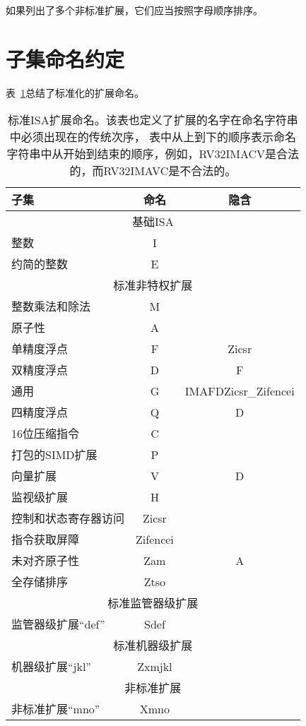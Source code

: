 如果列出了多个非标准扩展，它们应当按照字母顺序排序。

\section{子集命名约定}
表~\ref{isanametable}总结了标准化的扩展命名。
~\\
\begin{table}[h]
\center
\begin{tabular}{|l|c|c|}
\hline
子集 & 命名 & 隐含 \\
\hline
\hline
\multicolumn{3}{|c|}{基础ISA}\\
\hline
整数 & I & \\
约简的整数 & E & \\
\hline
\hline
\multicolumn{3}{|c|}{标准非特权扩展}\\
\hline
整数乘法和除法 & M & \\
原子性 & A & \\
单精度浮点 & F & Zicsr \\
双精度浮点 & D & F \\
\hline
通用 & G & IMAFDZicsr\_Zifencei \\
\hline
四精度浮点 & Q & D\\
16位压缩指令 & C & \\
打包的SIMD扩展 & P & \\
向量扩展 & V & D \\
监视级扩展 & H & \\
控制和状态寄存器访问 & Zicsr & \\
指令获取屏障 & Zifencei & \\
未对齐原子性 & Zam & A \\
全存储排序 & Ztso & \\
\hline
\hline
\multicolumn{3}{|c|}{标准监管器级扩展}\\
\hline
监管器级扩展“def” & Sdef & \\
\hline
\hline
\multicolumn{3}{|c|}{标准机器级扩展}\\
\hline
机器级扩展“jkl” & Zxmjkl & \\
\hline
\hline
\multicolumn{3}{|c|}{非标准扩展}\\
\hline
非标准扩展“mno” & Xmno & \\
\hline
\end{tabular}
\caption{
  标准ISA扩展命名。该表也定义了扩展的名字在命名字符串中必须出现在的传统次序，
  表中从上到下的顺序表示命名字符串中从开始到结束的顺序，例如，RV32IMACV是合法的，而RV32IMAVC是不合法的。
  }
\label{isanametable}
\end{table}


